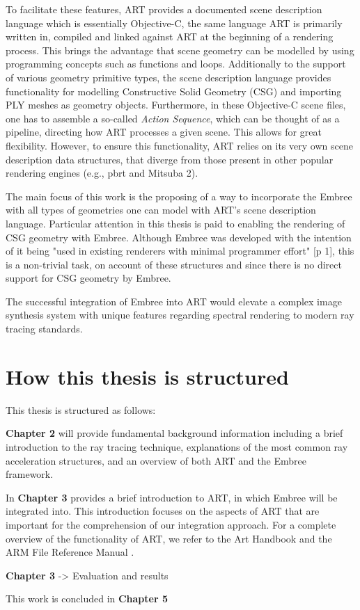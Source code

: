 To facilitate these features, ART provides a documented scene description language which is essentially Objective-C, the same language ART is primarily written in, compiled and linked against ART at the beginning of a rendering process. This brings the advantage that scene geometry can be modelled by using programming concepts   such as functions and loops. Additionally to the support of various geometry primitive types, the scene description language provides functionality for modelling Constructive Solid Geometry (CSG) and importing PLY meshes as geometry objects. Furthermore, in these Objective-C scene files, one has to assemble a so-called \emph{Action Sequence}, which can be thought of as a pipeline, directing how ART processes a given scene. 
This allows for great flexibility. However, to ensure this functionality, ART relies on its very own scene description data structures, that diverge from those present in other popular rendering engines (e.g., pbrt \cite{pharr2016physically} and Mitsuba 2).

The main focus of this work is the proposing of a way to incorporate the Embree with all types of geometries one can model with ART's scene description language. Particular attention in this thesis is paid to enabling the rendering of CSG geometry with Embree. 
Although Embree was developed with the intention of it being "used in existing renderers with minimal programmer effort" \cite{wald2014embree}[p 1], this is a non-trivial task, on account of these structures and since there is no direct support for CSG geometry by Embree.

The successful integration of Embree into ART would elevate a complex image synthesis system with unique features regarding spectral rendering to modern ray tracing standards. 


\section*{How this thesis is structured}

This thesis is structured as follows: 

\textbf{Chapter 2} will provide fundamental background information including a brief introduction to the ray tracing technique, explanations of the most common ray acceleration structures, and an overview of both ART and the Embree framework.

In \textbf{Chapter 3} provides a brief introduction to ART, in which Embree will be integrated into. This introduction focuses on the aspects of ART that are important for the comprehension of our integration approach. For a complete overview of the functionality of ART, we refer to the Art Handbook \cite{arthandbook} and the ARM File Reference Manual \cite{artreferencemanual}. 

\textbf{Chapter 3} -> Evaluation and results

This work is concluded in \textbf{Chapter 5}